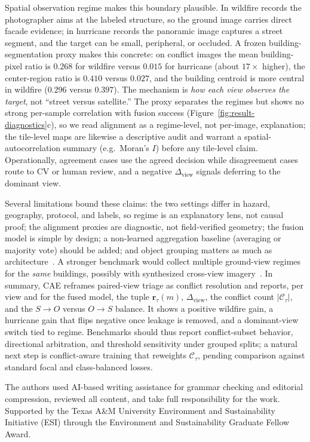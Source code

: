 \documentclass[sigconf]{acmart}
\newcommand{\conf}{\mathcal{C}_{\tau}}
\newcommand{\dview}{\Delta_{\mathrm{view}}}
\begin{document}
Spatial observation regime makes this boundary plausible. In wildfire records
the photographer aims at the labeled structure, so the ground image carries
direct facade evidence; in hurricane records the panoramic image captures a
street segment, and the target can be small, peripheral, or occluded. A frozen
building-segmentation proxy makes this concrete: on conflict images the mean
building-pixel ratio is $0.268$ for wildfire versus $0.015$ for hurricane (about
$17\times$ higher), the center-region ratio is $0.410$ versus $0.027$, and the
building centroid is more central in wildfire ($0.296$ versus $0.397$). The
mechanism is \emph{how each view observes the target}, not ``street versus
satellite.'' The proxy separates the regimes but shows no strong per-sample
correlation with fusion success (Figure~\ref{fig:result-diagnostics}c), so we
read alignment as a regime-level, not per-image, explanation; the tile-level
maps are likewise a descriptive audit and warrant a spatial-autocorrelation
summary (e.g.\ Moran's $I$) before any tile-level claim. Operationally,
agreement cases use the agreed decision while disagreement cases route to CV or
human review, and a negative $\dview$ signals deferring to the dominant view.

Several limitations bound these claims: the two settings differ in hazard,
geography, protocol, and labels, so regime is an explanatory lens, not causal
proof; the alignment proxies are diagnostic, not field-verified geometry; the
fusion model is simple by design; a non-learned aggregation baseline (averaging
or majority vote) should be added; and object grouping matters as much as
architecture~\cite{roberts2017cross}. A stronger benchmark would collect
multiple ground-view regimes for the \emph{same} buildings, possibly with
synthesized cross-view imagery~\cite{yang2026satellite}. In summary, CAE
reframes paired-view triage as conflict resolution and reports, per view and for
the fused model, the tuple $\mathbf{r}_{\tau}(m)$, $\dview$, the conflict count
$|\conf|$, and the $S{\rightarrow}O$ versus $O{\rightarrow}S$ balance. It shows a
positive wildfire gain, a hurricane gain that flips negative once leakage is
removed, and a dominant-view switch tied to regime. Benchmarks should thus
report conflict-subset behavior, directional arbitration, and threshold
sensitivity under grouped splits; a natural next step is conflict-aware training
that reweights $\conf$, pending comparison against standard focal and
class-balanced losses.

\begin{acks}
The authors used AI-based writing assistance for grammar checking and editorial
compression, reviewed all content, and take full responsibility for the work.
Supported by the Texas A\&M University Environment and Sustainability Initiative
(ESI) through the Environment and Sustainability Graduate Fellow Award.
\end{acks}



\end{document}
